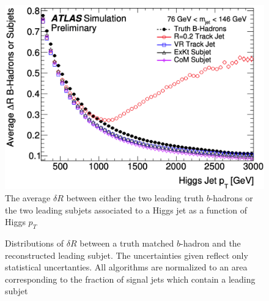 \begin{figure}[!htbp]
  \centering
  \includegraphics[width=0.98\linewidth]{figures/objects/average_deltaR}

  \caption{\cite{ATL-PHYS-PUB-2017-010} The average $\delta R$ between either
the two leading truth $b$-hadrons or the two leading subjets associated to a
Higgs jet as a function of Higgs $p_{T}$}
  \label{sec:objects:average_deltaR}
\end{figure}

\begin{figure}[!htbp]
  \centering
   \hfill

  \caption{\cite{ATL-PHYS-PUB-2017-010} Distributions of $\delta R$ between a
truth matched $b$-hadron and the reconstructed leading subjet.  The
uncertainties given reflect only statistical uncertanties.  All algorithms are
normalized to an area corresponding to the fraction of signal jets which
contain a leading subjet} 
  \label{sec:objects:leading_vr}
\end{figure}

